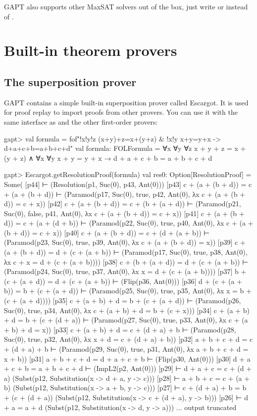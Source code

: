 \documentclass[a4paper,11pt]{book}
\newcommand{\cli}[1]{{\ttfamily {#1}}}
\begin{document}
GAPT also supports other MaxSAT solvers out of the box, just write
\cli{OpenWBO} or \cli{ToySolver} instead of \cli{MaxSat4j}.




\chapter{Built-in theorem provers}

\section{The superposition prover \cli{escargot}}

GAPT contains a simple built-in superposition prover called Escargot.  It is
used for proof replay to import proofs from other provers. You can use it with
the same interface as \cli{Prover9} and the other first-order provers:

\begin{clilisting}
gapt> val formula = fof"!x!y!z (x+y)+z=x+(y+z) & !x!y x+y=y+x -> d+a+c+b=a+b+c+d"
val formula: FOLFormula = ∀x ∀y ∀z x + y + z = x + (y + z) ∧ ∀x ∀y x + y = y + x →
  d + a + c + b = a + b + c + d

gapt> Escargot.getResolutionProof(formula)
val res0: Option[ResolutionProof] = Some(
  [p44]  ⊢    (Resolution(p1, Suc(0), p43, Ant(0)))
[p43] c + (a + (b + d)) = c + (a + (b + d)) ⊢    (Paramod(p17, Suc(0), true, p42, Ant(0), λx c + (a + (b + d)) = c + x))
[p42] c + (a + (b + d)) = c + (b + (a + d)) ⊢    (Paramod(p21, Suc(0), false, p41, Ant(0), λx c + (a + (b + d)) = c + x))
[p41] c + (a + (b + d)) = c + (a + (d + b)) ⊢    (Paramod(p22, Suc(0), true, p40, Ant(0), λx c + (a + (b + d)) = c + x))
[p40] c + (a + (b + d)) = c + (d + (a + b)) ⊢    (Paramod(p23, Suc(0), true, p39, Ant(0), λx c + (a + (b + d)) = x))
[p39] c + (a + (b + d)) = d + (c + (a + b)) ⊢    (Paramod(p17, Suc(0), true, p38, Ant(0), λx c + x = d + (c + (a + b))))
[p38] c + (b + (a + d)) = d + (c + (a + b)) ⊢    (Paramod(p24, Suc(0), true, p37, Ant(0), λx x = d + (c + (a + b))))
[p37] b + (c + (a + d)) = d + (c + (a + b)) ⊢    (Flip(p36, Ant(0)))
[p36] d + (c + (a + b)) = b + (c + (a + d)) ⊢    (Paramod(p25, Suc(0), true, p35, Ant(0), λx x = b + (c + (a + d))))
[p35] c + (a + b) + d = b + (c + (a + d)) ⊢    (Paramod(p26, Suc(0), true, p34, Ant(0), λx c + (a + b) + d = b + (c + x)))
[p34] c + (a + b) + d = b + (c + (d + a)) ⊢    (Paramod(p27, Suc(0), true, p33, Ant(0), λx c + (a + b) + d = x))
[p33] c + (a + b) + d = c + (d + a) + b ⊢    (Paramod(p28, Suc(0), true, p32, Ant(0), λx x + d = c + (d + a) + b))
[p32] a + b + c + d = c + (d + a) + b ⊢    (Paramod(p29, Suc(0), true, p31, Ant(0), λx a + b + c + d = x + b))
[p31] a + b + c + d = d + a + c + b ⊢    (Flip(p30, Ant(0)))
[p30] d + a + c + b = a + b + c + d ⊢    (ImpL2(p2, Ant(0)))
[p29]  ⊢ d + a + c = c + (d + a)   (Subst(p12, Substitution(x -> d + a, y -> c)))
[p28]  ⊢ a + b + c = c + (a + b)   (Subst(p12, Substitution(x -> a + b, y -> c)))
[p27]  ⊢ c + (d + a) + b = b + (c + (d + a))   (Subst(p12, Substitution(x -> c + (d + a), y -> b)))
[p26]  ⊢ d + a = a + d   (Subst(p12, Substitution(x -> d, y -> a)))
... output truncated

\end{clilisting}
\end{document}
